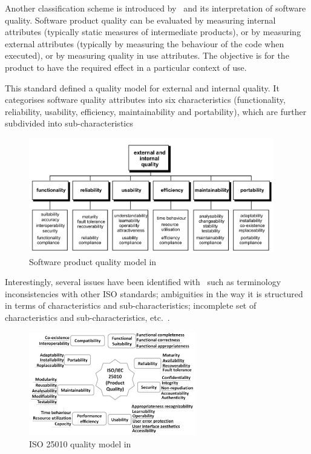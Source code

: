\documentclass[dissertation,final]{softeng}
\begin{document}
{Another classification scheme is introduced by~ and its interpretation of software quality. Software product quality can be evaluated by measuring internal attributes (typically static measures of intermediate products), or by measuring external attributes (typically by measuring the behaviour of the code when executed), or by measuring quality in use attributes. The objective is for the product to have the required effect in a particular context of use.

This standard defined a quality model for external and internal quality. It categorises software quality attributes into six characteristics (functionality, reliability, usability, efficiency, maintainability and portability), which are further subdivided into sub-characteristics

\begin{figure}[h]
\includegraphics[width=0.95\textwidth]{QualityInLifecycle}
\centering
\caption[Software product quality model]{Software product quality model in ~}
\label{fig:QualityInLifecycle}
\end{figure}

Interestingly, several issues have been identified with~ such as terminology inconsistencies with other ISO standards; ambiguities in the way it is structured in terms of characteristics and sub-characteristics; incomplete set of characteristics and sub-characteristics, etc.~\citep{Al-Qutaish}.

\begin{figure}[h]
\includegraphics[width=0.65\textwidth]{iso25010}
\centering
\caption[ISO 25010 quality model]{ISO 25010 quality model in ~}
\label{fig:iso25010}
\end{figure}

}
\end{document}
